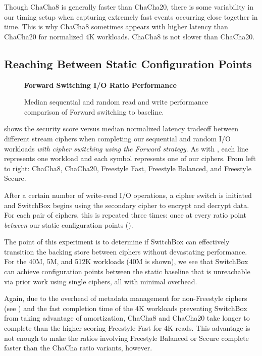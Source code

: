 Though ChaCha8 is generally faster than ChaCha20, there is some variability in
our timing setup when capturing extremely fast events occurring close together
in time. This is why ChaCha8 sometimes appears with higher latency than
ChaCha20 for normalized 4K workloads. ChaCha8 is not slower than ChaCha20.

\subsection{Reaching Between Static Configuration Points}

\begin{figure}[ht]
  \textbf{Forward Switching I/O Ratio Performance}\par\medskip
  {} \caption{Median sequential and
  random read and write performance comparison of Forward switching to
  baseline.}
 \label{fig:tradeoff-with-ratios}
\end{figure}

 shows the security score versus median normalized
latency tradeoff between different stream ciphers when completing our sequential
and random I/O workloads \emph{with cipher switching using the Forward
strategy}. As with , each line represents one
workload and each symbol represents one of our ciphers. From left to right:
ChaCha8, ChaCha20, Freestyle Fast, Freestyle Balanced, and Freestyle Secure.

After a certain number of write-read I/O operations, a cipher switch is
initiated and SwitchBox begins using the secondary cipher to encrypt and decrypt
data. For each pair of ciphers, this is repeated three times: once at every
ratio point \emph{between} our static configuration points ().

The point of this experiment is to determine if SwitchBox can effectively
transition the backing store between ciphers without devastating performance.
For the 40M, 5M, and 512K workloads (40M is shown), we see that SwitchBox can
achieve configuration points between the static baseline that is unreachable via
prior work using single ciphers, all with minimal overhead.

Again, due to the overhead of metadata management for non-Freestyle ciphers (see
) and the fast completion time of the 4K workloads
preventing SwitchBox from taking advantage of amortization, ChaCha8 and ChaCha20
take longer to complete than the higher scoring Freestyle Fast for 4K reads.
This advantage is not enough to make the ratios involving Freestyle Balanced or
Secure complete faster than the ChaCha ratio variants, however.

